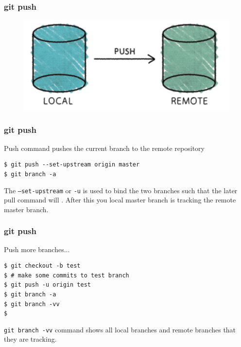 \documentclass{beamer}
\begin{document}
\begin{frame}[fragile]
\frametitle{git push}
\begin{figure}

  \includegraphics[scale=0.3]{figures/f6.png}
\end{figure}
\end{frame}


\begin{frame}[fragile]
\frametitle{git push}

Push command pushes the current branch to the remote repository

\begin{lstlisting}
$ git push --set-upstream origin master 
$ git branch -a
\end{lstlisting}

The \texttt{---set-upstream} or \texttt{-u} is used to bind the two
branches such that the later pull command will . After this you local master
branch is tracking the remote master branch.

\end{frame}


\begin{frame}[fragile]
\frametitle{git push}

Push more branches...

\begin{lstlisting}
$ git checkout -b test
$ # make some commits to test branch
$ git push -u origin test 
$ git branch -a
$ git branch -vv
$ 
\end{lstlisting}

\texttt{git branch -vv} command shows all local branches and remote
branches that they are tracking.

\end{frame}



\end{document}
